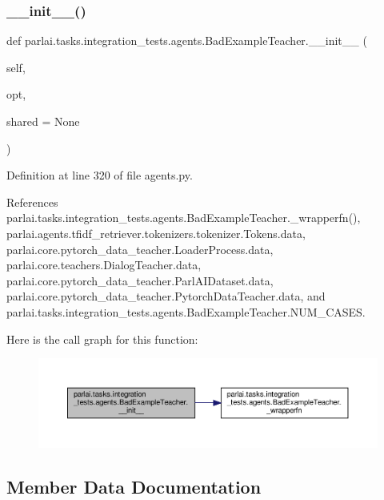 \subsubsection{\texorpdfstring{\+\_\+\+\_\+init\+\_\+\+\_\+()}{\_\_init\_\_()}}
{\footnotesize\ttfamily def parlai.\+tasks.\+integration\+\_\+tests.\+agents.\+Bad\+Example\+Teacher.\+\_\+\+\_\+init\+\_\+\+\_\+ (\begin{DoxyParamCaption}\item[{}]{self,  }\item[{}]{opt,  }\item[{}]{shared = {\ttfamily None} }\end{DoxyParamCaption})}



Definition at line 320 of file agents.\+py.



References parlai.\+tasks.\+integration\+\_\+tests.\+agents.\+Bad\+Example\+Teacher.\+\_\+wrapperfn(), parlai.\+agents.\+tfidf\+\_\+retriever.\+tokenizers.\+tokenizer.\+Tokens.\+data, parlai.\+core.\+pytorch\+\_\+data\+\_\+teacher.\+Loader\+Process.\+data, parlai.\+core.\+teachers.\+Dialog\+Teacher.\+data, parlai.\+core.\+pytorch\+\_\+data\+\_\+teacher.\+Parl\+A\+I\+Dataset.\+data, parlai.\+core.\+pytorch\+\_\+data\+\_\+teacher.\+Pytorch\+Data\+Teacher.\+data, and parlai.\+tasks.\+integration\+\_\+tests.\+agents.\+Bad\+Example\+Teacher.\+N\+U\+M\+\_\+\+C\+A\+S\+ES.

Here is the call graph for this function\+:
\nopagebreak
\begin{figure}[H]
\begin{center}
\leavevmode
\includegraphics[width=350pt]{classparlai_1_1tasks_1_1integration__tests_1_1agents_1_1BadExampleTeacher_a977f478a2379e0f40525f3dd5408a87c_cgraph}
\end{center}
\end{figure}


\subsection{Member Data Documentation}
\mbox{\label{classparlai_1_1tasks_1_1integration__tests_1_1agents_1_1BadExampleTeacher_aa13107dbd3fd1bbff91491e2860ea6dc}} 
